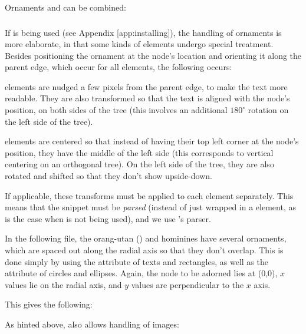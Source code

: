
\noindent{}Ornaments and \css{} can be combined:


\subsubsection[sct:display:libxml]{\libxml}

If \libxml{} is being used (see Appendix \in{}[app:installing]), the handling of ornaments is more elaborate, in that some kinds of elements undergo special treatment. Besides positioning the ornament at the node's location and orienting it along the parent edge, which occur for all elements, the following occurs:
\startitemize
	\item {} elements are nudged a few pixels from the parent edge,
	to make the text more readable. They are also transformed so that the text
	is aligned with the node's position, on both sides of the tree (this
	involves an additional $180^{\circ}$  rotation on the left side of the
	tree).
	\item {} elements are centered so that instead of having
	their top left corner at the node's position, they have the middle of the
	left side (this corresponds to vertical centering on an orthogonal tree).
	On the left side of the tree, they are also rotated and shifted so that
	they don't show upside-down.
\stopitemize

If applicable, these transforms must be applied to each element separately.
This means that the \svg{} snippet must be {\em parsed} (instead of just
wrapped in a  element, as is the case when \libxml{} is not being
used), and we use \libxml's \xml{} parser. 

In the following file, the orang-utan () and hominines have
several ornaments, which are spaced out along the radial axis so that they don't
overlap. This is done simply by using the  attribute of texts and
rectangles, as well as the  attribute of circles and ellipses. Again,
the node to be adorned lies at (0,0), $x$ values lie on the radial axis, and $y$
values are perpendicular to the $x$ axis.


This gives the following:


As hinted above, \libxml{} also allows handling of images:

